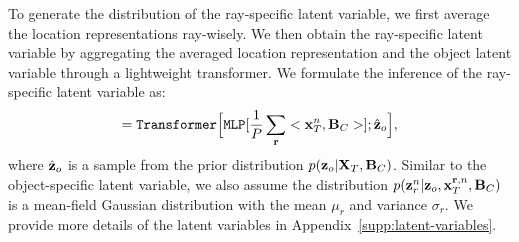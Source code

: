 To generate the distribution of the ray-specific latent variable, we first average the location representations ray-wisely. 
We then obtain the ray-specific latent variable by aggregating the averaged location representation and the object latent variable through a lightweight transformer. We formulate the inference of the ray-specific latent variable as:
\begin{equation}
    [\mu_{{r}}, \sigma_{{r}}] = \texttt{Transformer} \Big[\texttt{MLP}[\frac{1}{P}\sum_{\mathbf{r}}
    <{\bf{x}}_{T}^{n}, {\bf{B}}_C >]; \hat{{\bf{z}}}_o \Big],
\end{equation}
where $\hat{{\bf{z}}}_o$ is a sample from the prior distribution $p({\bf{z}}_o | {\bf{X}}_T, {\bf{B}}_C)$. 
Similar to the object-specific latent variable, we also assume the distribution $p({\bf{z}}_r^n| {\bf{z}}_o,  {\bf{x}}_{T}^{\mathbf{r}, n}, {\bf{B}}_C)$ is a mean-field Gaussian distribution with the mean $\mu_{{r}}$ and variance $\sigma_{{r}}$. We provide more details of the latent variables in Appendix~\ref{supp:latent-variables}.





